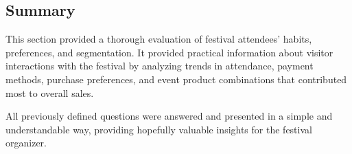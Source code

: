 \subsection{Summary}
\label{subsec:analysis-customer-summary}

This section provided a thorough evaluation of festival attendees' habits, preferences, and segmentation.
It provided practical information about visitor interactions with the festival by analyzing trends in attendance, payment methods, purchase preferences, and event product combinations that contributed most to overall sales.

All previously defined questions were answered and presented in a simple and understandable way, providing hopefully valuable insights for the festival organizer.